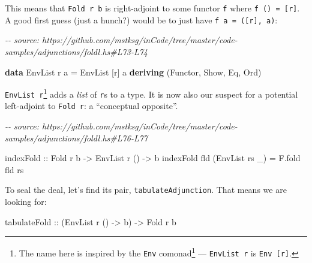 \documentclass[]{article}
\newenvironment{Shaded}{}{}
\newcommand{\CommentTok}[1]{\textcolor[rgb]{0.38,0.63,0.69}{\textit{#1}}}
\newcommand{\DataTypeTok}[1]{\textcolor[rgb]{0.56,0.13,0.00}{#1}}
\newcommand{\KeywordTok}[1]{\textcolor[rgb]{0.00,0.44,0.13}{\textbf{#1}}}
\newcommand{\NormalTok}[1]{#1}
\newcommand{\OtherTok}[1]{\textcolor[rgb]{0.00,0.44,0.13}{#1}}
\renewcommand{\href}[2]{#2\footnote{\url{#1}}}
\begin{document}
This means that \texttt{Fold\ r\ b} is right-adjoint to some functor \texttt{f}
where \texttt{f\ ()\ =\ {[}r{]}}. A good first guess (just a hunch?) would be to
just have \texttt{f\ a\ =\ ({[}r{]},\ a)}:

\begin{Shaded}
\begin{Highlighting}[]
\CommentTok{{-}{-} source: https://github.com/mstksg/inCode/tree/master/code{-}samples/adjunctions/foldl.hs\#L73{-}L74}

\KeywordTok{data} \DataTypeTok{EnvList}\NormalTok{ r a }\OtherTok{=} \DataTypeTok{EnvList}\NormalTok{ [r] a}
  \KeywordTok{deriving}\NormalTok{ (}\DataTypeTok{Functor}\NormalTok{, }\DataTypeTok{Show}\NormalTok{, }\DataTypeTok{Eq}\NormalTok{, }\DataTypeTok{Ord}\NormalTok{)}
\end{Highlighting}
\end{Shaded}

\texttt{EnvList\ r}\footnote{The name here is inspired by the
  \href{https://hackage.haskell.org/package/comonad/docs/Control-Comonad-Trans-Env.html}{\texttt{Env}
  comonad} --- \texttt{EnvList\ r} is \texttt{Env\ {[}r{]}}.} adds a \emph{list}
of \texttt{r}s to a type. It is now also our suspect for a potential
left-adjoint to \texttt{Fold\ r}: a ``conceptual opposite''.

\begin{Shaded}
\begin{Highlighting}[]
\CommentTok{{-}{-} source: https://github.com/mstksg/inCode/tree/master/code{-}samples/adjunctions/foldl.hs\#L76{-}L77}

\OtherTok{indexFold ::} \DataTypeTok{Fold}\NormalTok{ r b }\OtherTok{{-}\textgreater{}} \DataTypeTok{EnvList}\NormalTok{ r () }\OtherTok{{-}\textgreater{}}\NormalTok{ b}
\NormalTok{indexFold fld (}\DataTypeTok{EnvList}\NormalTok{ rs \_) }\OtherTok{=}\NormalTok{ F.fold fld rs}
\end{Highlighting}
\end{Shaded}

To seal the deal, let's find its pair, \texttt{tabulateAdjunction}. That means
we are looking for:

\begin{Shaded}
\begin{Highlighting}[]
\OtherTok{tabulateFold ::}\NormalTok{ (}\DataTypeTok{EnvList}\NormalTok{ r () }\OtherTok{{-}\textgreater{}}\NormalTok{ b) }\OtherTok{{-}\textgreater{}} \DataTypeTok{Fold}\NormalTok{ r b}
\end{Highlighting}
\end{Shaded}
\end{document}
